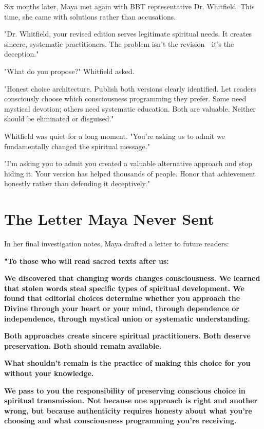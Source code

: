 \documentclass[11pt,twoside]{book}
\begin{document}
Six months later, Maya met again with BBT representative Dr. Whitfield. This time, she came with solutions rather than accusations.

"Dr. Whitfield, your revised edition serves legitimate spiritual needs. It creates sincere, systematic practitioners. The problem isn't the revision—it's the deception."

"What do you propose?" Whitfield asked.

"Honest choice architecture. Publish both versions clearly identified. Let readers consciously choose which consciousness programming they prefer. Some need mystical devotion; others need systematic education. Both are valuable. Neither should be eliminated or disguised."

Whitfield was quiet for a long moment. "You're asking us to admit we fundamentally changed the spiritual message."

"I'm asking you to admit you created a valuable alternative approach and stop hiding it. Your version has helped thousands of people. Honor that achievement honestly rather than defending it deceptively."
\section*{The Letter Maya Never Sent}
\label{sec:orgbdbf87c}

In her final investigation notes, Maya drafted a letter to future readers:

\textbf{"To those who will read sacred texts after us:}

\textbf{We discovered that changing words changes consciousness. We learned that stolen words steal specific types of spiritual development. We found that editorial choices determine whether you approach the Divine through your heart or your mind, through dependence or independence, through mystical union or systematic understanding.}

\textbf{Both approaches create sincere spiritual practitioners. Both deserve preservation. Both should remain available.}

\textbf{What shouldn't remain is the practice of making this choice for you without your knowledge.}

\textbf{We pass to you the responsibility of preserving conscious choice in spiritual transmission. Not because one approach is right and another wrong, but because authenticity requires honesty about what you're choosing and what consciousness programming you're receiving.}
\end{document}
